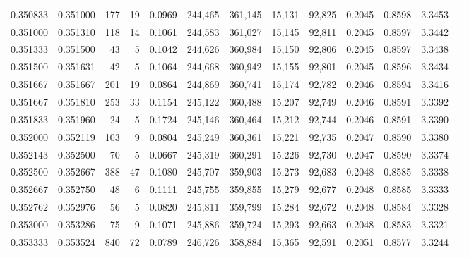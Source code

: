 \begin{tabular}{rrrrrrrrrrrrr}
0.350833 & 0.351000 &   177 &  19 &                                     0.0969 & 244,465 & 361,145 &  15,131 &  92,825 & 0.2045 & 0.8598 & 3.3453 \\
0.351000 & 0.351310 &   118 &  14 &                                     0.1061 & 244,583 & 361,027 &  15,145 &  92,811 & 0.2045 & 0.8597 & 3.3442 \\
0.351333 & 0.351500 &    43 &   5 &                                     0.1042 & 244,626 & 360,984 &  15,150 &  92,806 & 0.2045 & 0.8597 & 3.3438 \\
0.351500 & 0.351631 &    42 &   5 &                                     0.1064 & 244,668 & 360,942 &  15,155 &  92,801 & 0.2045 & 0.8596 & 3.3434 \\
0.351667 & 0.351667 &   201 &  19 &                                     0.0864 & 244,869 & 360,741 &  15,174 &  92,782 & 0.2046 & 0.8594 & 3.3416 \\
0.351667 & 0.351810 &   253 &  33 &                                     0.1154 & 245,122 & 360,488 &  15,207 &  92,749 & 0.2046 & 0.8591 & 3.3392 \\
0.351833 & 0.351960 &    24 &   5 &                                     0.1724 & 245,146 & 360,464 &  15,212 &  92,744 & 0.2046 & 0.8591 & 3.3390 \\
0.352000 & 0.352119 &   103 &   9 &                                     0.0804 & 245,249 & 360,361 &  15,221 &  92,735 & 0.2047 & 0.8590 & 3.3380 \\
0.352143 & 0.352500 &    70 &   5 &                                     0.0667 & 245,319 & 360,291 &  15,226 &  92,730 & 0.2047 & 0.8590 & 3.3374 \\
0.352500 & 0.352667 &   388 &  47 &                                     0.1080 & 245,707 & 359,903 &  15,273 &  92,683 & 0.2048 & 0.8585 & 3.3338 \\
0.352667 & 0.352750 &    48 &   6 &                                     0.1111 & 245,755 & 359,855 &  15,279 &  92,677 & 0.2048 & 0.8585 & 3.3333 \\
0.352762 & 0.352976 &    56 &   5 &                                     0.0820 & 245,811 & 359,799 &  15,284 &  92,672 & 0.2048 & 0.8584 & 3.3328 \\
0.353000 & 0.353286 &    75 &   9 &                                     0.1071 & 245,886 & 359,724 &  15,293 &  92,663 & 0.2048 & 0.8583 & 3.3321 \\
0.353333 & 0.353524 &   840 &  72 &                                     0.0789 & 246,726 & 358,884 &  15,365 &  92,591 & 0.2051 & 0.8577 & 3.3244 \\

\end{tabular}
